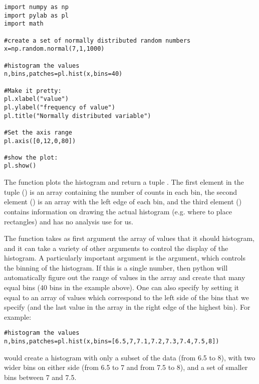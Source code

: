 \begin{lstlisting}[frame=single] 
import numpy as np
import pylab as pl
import math 

#create a set of normally distributed random numbers
x=np.random.normal(7,1,1000)

#histogram the values
n,bins,patches=pl.hist(x,bins=40)

#Make it pretty:
pl.xlabel("value")
pl.ylabel("frequency of value")
pl.title("Normally distributed variable")

#Set the axis range
pl.axis([0,12,0,80])

#show the plot:
pl.show()
\end{lstlisting} 

The  function plots the histogram and return a tuple . The first element in the tuple () is an array containing the number of counts in each bin, the second element () is an array with the left edge of each bin, and the third element () contains information on drawing the actual histogram (e.g. where to place rectangles) and has no analysis use for us.

The  function takes as first argument the array of values that it should histogram, and it can take a variety of other arguments to control the display of the histogram. A particularly important argument is the  argument, which controls the binning of the histogram. If this is a single number, then python will automatically figure out the range of values in the array and create that many equal bins (40 bins in the example above). One can also specify  by setting it equal to an array of values which correspond to the left side of the bins that we specify (and the last value in the array in the right edge of the highest bin). For example:
\begin{lstlisting}[frame=single] 
#histogram the values
n,bins,patches=pl.hist(x,bins=[6.5,7,7.1,7.2,7.3,7.4,7.5,8])
\end{lstlisting}
would create a histogram with only a subset of the data (from 6.5 to 8), with two wider bins on either side (from 6.5 to 7 and from 7.5 to 8), and a set of smaller bins between 7 and 7.5.

